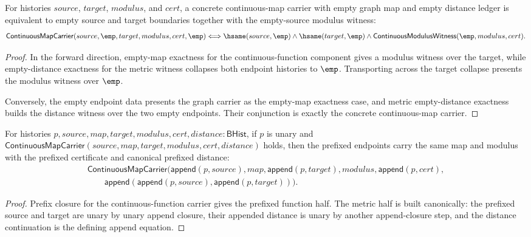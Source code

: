 \begin{theorem}
\label{thm:continuousmap-empty-map-empty-distance-boundaries}
For histories $source$, $target$, $modulus$, and $cert$, a concrete
continuous-map carrier with empty graph map and empty distance ledger is
equivalent to empty source and target boundaries together with the empty-source
modulus witness:
$$
\mathsf{ContinuousMapCarrier}(source,\emp,target,modulus,cert,\emp)
\Longleftrightarrow
\hsame(source,\emp)\land\hsame(target,\emp)\land
\mathsf{ContinuousModulusWitness}(\emp,modulus,cert).
$$
\end{theorem}
\begin{proof}
In the forward direction, empty-map exactness for the continuous-function
component gives a modulus witness over the target, while empty-distance
exactness for the metric witness collapses both endpoint histories to
$\emp$. Transporting across the target collapse presents the modulus witness
over $\emp$.

Conversely, the empty endpoint data presents the graph carrier as the
empty-map exactness case, and metric empty-distance exactness builds the
distance witness over the two empty endpoints. Their conjunction is exactly the
concrete continuous-map carrier.
\end{proof}

\begin{theorem}
\label{thm:continuousmap-carrier-prefix-canonical-distance-closed}
For histories $p,source,map,target,modulus,cert,distance:\mathsf{BHist}$,
if $p$ is unary and
$\mathsf{ContinuousMapCarrier}(source,map,target,modulus,cert,distance)$
holds, then the prefixed endpoints carry the same map and modulus with the
prefixed certificate and canonical prefixed distance:
$$
\begin{array}{l}
\mathsf{ContinuousMapCarrier}
(\mathsf{append}(p,source),map,\mathsf{append}(p,target),modulus,
\mathsf{append}(p,cert),\\
\qquad \mathsf{append}(\mathsf{append}(p,source),\mathsf{append}(p,target))).
\end{array}
$$
\end{theorem}
\begin{proof}
Prefix closure for the continuous-function carrier gives the prefixed function
half. The metric half is built canonically: the prefixed source and target are
unary by unary append closure, their appended distance is unary by another
append-closure step, and the distance continuation is the defining append
equation.
\end{proof}


